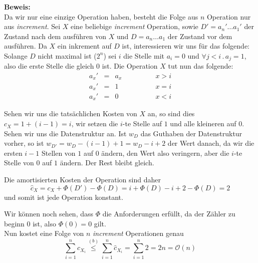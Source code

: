 \documentclass[11pt,a4paper,ngerman]{article}
\begin{document}
\noindent\textbf{Beweis:}\\
Da wir nur eine einzige Operation haben, besteht die Folge aus $n$ Operation nur aus \emph{increment}. Sei $X$ eine beliebige \emph{increment} Operation, sowie $D'=a_n'\dots a_1'$ der Zustand nach dem ausführen von $X$ und $D=a_n\dots a_1$ der Zustand vor dem ausführen. Da $X$ ein inkrement auf $D$ ist, interessieren wir uns für das folgende: Solange $D$ nicht maximal ist ($2^n$) sei $i$ die Stelle mit $a_i = 0$ und $\forall j < i \, . \, a_j = 1$, also die erste Stelle die gleich $0$ ist. Die Operation $X$ tut nun das folgende:
$$\begin{array}{rclr}
	a_x' &=& a_x\qquad \qquad &  x > i\\
	a_x' &=& 1 & x = i\\
	a_x' &=& 0 & x < i
\end{array}$$

Sehen wir uns die tatsächlichen Kosten von $X$ an, so sind dies $c_X = 1 + (i-1) = i$, wir setzen die $i$-te Stelle auf $1$ und alle kleineren auf $0$.
Sehen wir uns die Datenstruktur an. Ist $w_D$ das Guthaben der Datenstruktur vorher, so ist $w_{D'} = w_D - (i-1) + 1 = w_D - i +2$ der Wert danach, da wir die ersten $i-1$ Stellen von $1$ auf $0$ ändern, den Wert also veringern, aber die $i$-te Stelle von $0$ auf $1$ ändern. Der Rest bleibt gleich.

Die amortisierten Kosten der Operation sind daher
$$
	\hat{c}_X = c_X + \Phi(D') - \Phi(D) = i + \Phi(D) -  i  + 2 - \Phi(D) = 2
$$
und somit ist jede Operation konstant.

Wir können noch sehen, dass $\Phi$ die Anforderungen erfüllt, da der Zähler zu beginn $0$ ist, also $\Phi(0) = 0$ gilt.\\

Nun kostet eine Folge von $n$ \emph{increment} Operationen genau
$$
	\sum_{i=1}^n c_{X_i} \stackrel{(b)}{\leq} \sum_{i=1}^n \hat{c}_{X_i} = \sum_{i=1}^n 2 = 2n = \mathcal{O}(n)
$$

\label{LastPage}
\end{document}
